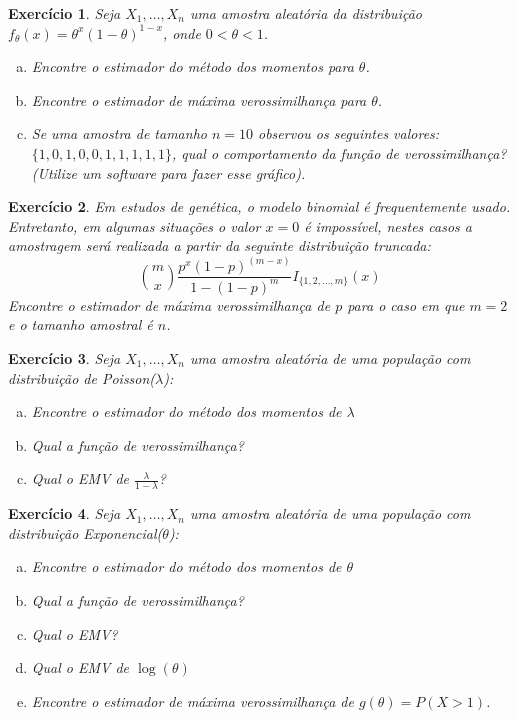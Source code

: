 \documentclass[letter,11pt]{article}
\newtheorem{exer}{Exercício}
\begin{document}
\medskip
\begin{exer} \rm
Seja $X_1, \ldots, X_n$ uma amostra aleatória da distribuição $f_\theta(x)=\theta^x(1-\theta)^{1-x}$, onde $0 < \theta< 1$.
\begin{enumerate}[a)]
  \item Encontre o estimador do método dos momentos para $\theta$.
  \item Encontre o estimador de máxima verossimilhança para $\theta$.
  \item Se uma amostra de tamanho $n=10$ observou os seguintes valores: $\{1,0,1,0,0,1,1,1,1,1\}$, qual o comportamento da função de verossimilhança? (Utilize um software para fazer esse gráfico). 
\end{enumerate}
\end{exer}


\medskip
\begin{exer} \rm
Em estudos de genética, o modelo binomial é frequentemente usado. Entretanto, em algumas situações o valor $x=0$ é impossível, nestes casos a amostragem será realizada a partir da seguinte distribuição truncada:
  $$
  {m \choose x} \frac{p^x(1-p)^{(m-x)}}{1-(1-p)^m}I_{\{1,2,\ldots,m\}}(x)
  $$
Encontre o estimador de máxima verossimilhança de $p$ para o caso em que $m=2$ e o tamanho amostral é $n$.
\end{exer}


\medskip
\begin{exer} \rm
Seja $X_1, \ldots, X_n$ uma amostra aleatória de uma população com distribuição de Poisson($\lambda$):
\begin{enumerate}[a)]
  \item Encontre o estimador do método dos momentos de $\lambda$
  \item Qual a função de verossimilhança?
  \item Qual o EMV de $\frac{\lambda}{1-\lambda}$?
\end{enumerate}
\end{exer}


\medskip
\begin{exer} \rm
Seja $X_1, \ldots, X_n$ uma amostra aleatória de uma população com distribuição Exponencial($\theta$):
\begin{enumerate}[a)]
  \item Encontre o estimador do método dos momentos de $\theta$
  \item Qual a função de verossimilhança?
  \item Qual o EMV?
  \item Qual o EMV de $\log(\theta)$
  \item Encontre o estimador de máxima verossimilhança de $g(\theta) = P(X > 1)$.
\end{enumerate}
\end{exer}
\end{document}
